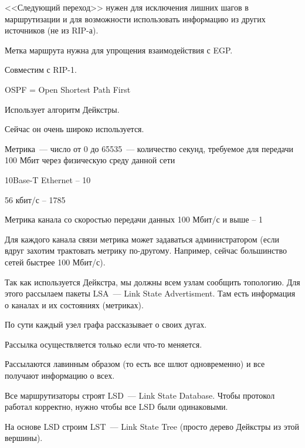 <<Следующий переход>> нужен для исключения лишних шагов в маршрутизации и для возможности использовать информацию из других источников (не из RIP-а).

Метка маршрута нужна для упрощения взаимодействия с EGP.

Совместим с RIP-1.


OSPF = Open Shortest Path First

Использует алгоритм Дейкстры.

Сейчас он очень широко используется.

Метрика~--- число от 0 до 65535~--- количество секунд, требуемое для передачи 100 Мбит через физическую среду данной сети
\begin{MyItemize}
    \item 10Base-T Ethernet – 10
    \item 56 кбит/с – 1785
    \item Метрика канала со скоростью передачи данных 100 Мбит/с и выше – 1
\end{MyItemize}

Для каждого канала связи метрика может задаваться администратором (если вдруг захотим трактовать метрику по-другому. Например, сейчас большинство сетей быстрее 100 Мбит/с).

Так как используется Дейкстра, мы должны всем узлам сообщить топологию. Для этого рассылаем пакеты LSA~--- Link State Advertisment. Там есть информация о каналах и их состояниях (метриках).

По сути каждый узел графа рассказывает о своих дугах.

Рассылка осуществляется только если что-то меняется. 

Рассылаются лавинным образом (то есть все шлют одновременно) и все получают информацию о всех.

Все маршрутизаторы строят LSD~--- Link State Database. Чтобы протокол работал корректно, нужно чтобы все LSD были одинаковыми.

На основе LSD строим LST~--- Link State Tree (просто дерево Дейкстры из этой вершины).


